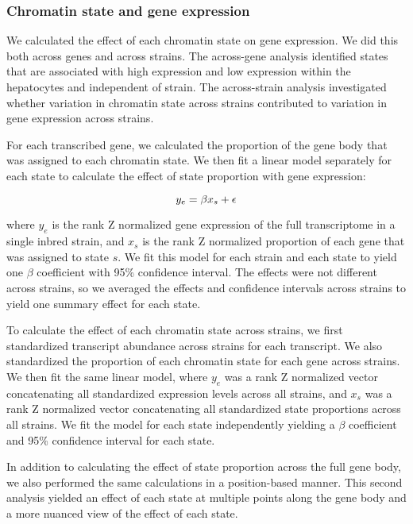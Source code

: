 \documentclass[10pt,letterpaper]{article}
\begin{document}
\hypertarget{chromatin-state-and-gene-expression}{%
\subsubsection{Chromatin state and gene
expression}\label{chromatin-state-and-gene-expression}}

We calculated the effect of each chromatin state on gene expression. We
did this both across genes and across strains. The across-gene analysis
identified states that are associated with high expression and low
expression within the hepatocytes and independent of strain. The
across-strain analysis investigated whether variation in chromatin state
across strains contributed to variation in gene expression across
strains.

For each transcribed gene, we calculated the proportion of the gene body
that was assigned to each chromatin state. We then fit a linear model
separately for each state to calculate the effect of state proportion
with gene expression:

\begin{equation*}{\label{eqn:chromatin_effect}}
y_{e} = \beta x_{s} + \epsilon
\end{equation*}

where \(y_{e}\) is the rank Z normalized gene expression of the full
transcriptome in a single inbred strain, and \(x_{s}\) is the rank Z
normalized proportion of each gene that was assigned to state \(s\). We
fit this model for each strain and each state to yield one \(\beta\)
coefficient with 95\% confidence interval. The effects were not
different across strains, so we averaged the effects and confidence
intervals across strains to yield one summary effect for each state.

To calculate the effect of each chromatin state across strains, we first
standardized transcript abundance across strains for each transcript. We
also standardized the proportion of each chromatin state for each gene
across strains. We then fit the same linear model, where \(y_{e}\) was a
rank Z normalized vector concatenating all standardized expression
levels across all strains, and \(x_{s}\) was a rank Z normalized vector
concatenating all standardized state proportions across all strains. We
fit the model for each state independently yielding a \(\beta\)
coefficient and 95\% confidence interval for each state.

In addition to calculating the effect of state proportion across the
full gene body, we also performed the same calculations in a
position-based manner. This second analysis yielded an effect of each
state at multiple points along the gene body and a more nuanced view of
the effect of each state.
\end{document}
